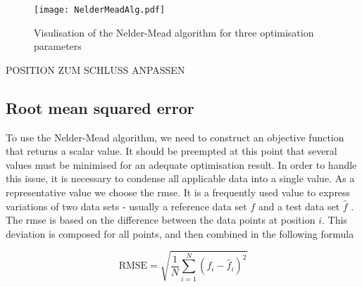


 



\begin{figure}[H]
    \centering
    \texttt{[image: NelderMeadAlg.pdf]}
    \caption{Visulisation of the Nelder-Mead algorithm for three optimisation parameters }
    \label{fig:nelderMead}
\end{figure}

POSITION ZUM SCHLUSS ANPASSEN

\subsection{Root mean squared error} \label{subsec: RMSE}
To use the Nelder-Mead algorithm, we need to construct an objective function that returns a scalar value. It should be preempted at this point that several values must be minimised for an adequate optimisation result. In order to handle this issue, it is necessary to condense all applicable data into a single value. As a representative value we choose the \acrfull{rmse}. It is a frequently used value to express variations of two data sets - usually a reference data set $f$ and a test data set $\hat{f}$ \cite{morrow_method_2010}. The \acrshort{rmse} is based on the difference between the data points at position $i$. This deviation is composed for all points, and then combined in the following formula

\begin{equation} \label{eq: RMSE}
    \text{RMSE} = \sqrt{\frac{1}{N}\sum_{i=1}^{N} (f_i - \hat{f}_i)^2}
\end{equation}

